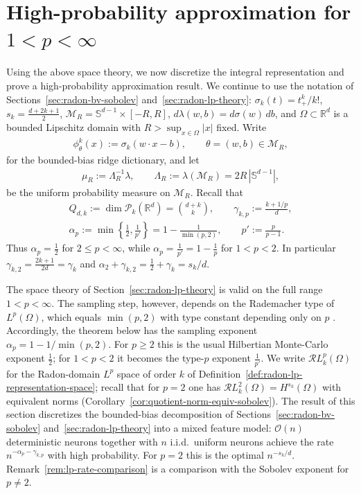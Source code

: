 \documentclass[12pt]{article}
\numberwithin{equation}{section}
\numberwithin{figure}{section}
\numberwithin{equation}{section}
\newcommand{\R}{\mathbb{R}}
\newcommand{\Sph}{\mathbb S}
\newcommand{\Pcal}{\mathcal P}
\newcommand{\MR}{\mathcal M_R}
\newcommand{\abs}[1]{\left|#1\right|}
\begin{document}
\section{High-probability approximation for
\texorpdfstring{$1<p<\infty$}{1<p<infty}}
\label{sec:approximation-radon-rf}
Using the above space theory, we now discretize the integral representation
and prove a high-probability approximation result.
We continue to use the notation of Sections~\ref{sec:radon-bv-sobolev}
and~\ref{sec:radon-lp-theory}: $\sigma_k(t)=t_+^k/k!$,
$s_k=\tfrac{d+2k+1}{2}$, $\MR=\Sph^{d-1}\times[-R,R]$,
$d\lambda(w,b)=d\sigma(w)\,db$, and $\Omega\subset\R^d$ is a bounded Lipschitz
domain with $R>\sup_{x\in\Omega}\abs x$ fixed. Write
\begin{align*}
    \phi^k_\theta(x):=\sigma_k(w\cdot x-b),
    \qquad\theta=(w,b)\in\MR,
\end{align*}
for the bounded-bias ridge dictionary, and let
\begin{align*}
    \mu_R:=\Lambda_R^{-1}\lambda,
    \qquad
    \Lambda_R:=\lambda(\MR)=2R\,\abs{\Sph^{d-1}},
\end{align*}
be the uniform probability measure on $\MR$. Recall that
\begin{align*}
    Q_{d,k}:=\dim\Pcal_k(\R^d)=\binom{d+k}{k},
    \qquad
    \gamma_{k,p}:=\frac{k+1/p}{d},
    \\
    \alpha_p:=\min\left\{\frac12,\frac1{p'}\right\}
    =1-\frac1{\min(p,2)},
    \qquad p':=\frac{p}{p-1}.
\end{align*}
Thus $\alpha_p=\tfrac12$ for $2\le p<\infty$, while
$\alpha_p=\tfrac1{p'}=1-\tfrac1p$ for $1<p<2$. In particular
$\gamma_{k,2}=\tfrac{2k+1}{2d}=\gamma_k$ and
$\alpha_2+\gamma_{k,2}=\tfrac12+\gamma_k=s_k/d$.

The space theory of Section~\ref{sec:radon-lp-theory} is valid on the full range
$1<p<\infty$. The sampling step, however, depends on the Rademacher type of
$L^p(\Omega)$, which equals $\min(p,2)$ with type constant depending only on $p$
\cite{ledoux_ProbabilityBanachSpaces_1991}. Accordingly, the theorem
below has the sampling exponent $\alpha_p=1-1/\min(p,2)$. For $p\ge2$ this is the
usual Hilbertian Monte-Carlo exponent $\tfrac12$; for $1<p<2$ it becomes the
type-$p$ exponent $\tfrac1{p'}$. We write
$\mathcal{R}L^p_k(\Omega)$ for the Radon-domain $L^p$ space of order $k$ of
Definition~\ref{def:radon-lp-representation-space}; recall that for $p=2$ one has
$\mathcal{R}L^2_k(\Omega)=H^{s_k}(\Omega)$ with equivalent norms
(Corollary~\ref{cor:quotient-norm-equiv-sobolev}). The result of this section
discretizes the bounded-bias decomposition of Sections~\ref{sec:radon-bv-sobolev}
and~\ref{sec:radon-lp-theory} into a mixed feature model: $\mathcal O(n)$ deterministic
neurons together with $n$ i.i.d.\ uniform neurons achieve the rate
$n^{-\alpha_p-\gamma_{k,p}}$ with high probability. For $p=2$ this is the optimal
$n^{-s_k/d}$. Remark~\ref{rem:lp-rate-comparison} is a comparison with the Sobolev 
exponent for $p\neq2$.
\end{document}
